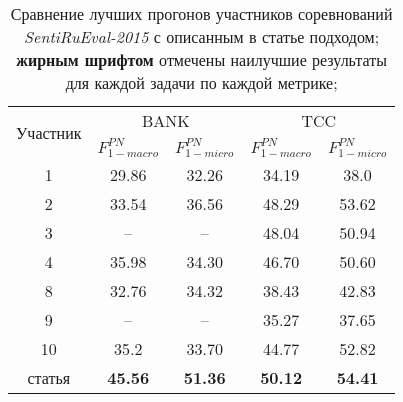 
\begin{table}[htp!]
\centering
\caption{
    Сравнение лучших прогонов участников соревнований {\it SentiRuEval-2015}
    с описанным в статье подходом;
    {\bf жирным шрифтом} отмечены наилучшие результаты для каждой задачи по
    каждой метрике;
}
\label{table:participants_results}
\begin{tabular}{ccccc}
\hline
\multicolumn{1}{l|}{\multirow{2}{*}{Участник}}                       & \multicolumn{2}{c|}{BANK}                                                         & \multicolumn{2}{c}{TCC}                                      \\ \cline{2-5}
\multicolumn{1}{l|}{}                                                & \multicolumn{1}{c|}{$F_{1-macro}^{PN}$} & \multicolumn{1}{c|}{$F_{1-micro}^{PN}$} & \multicolumn{1}{c|}{$F_{1-macro}^{PN}$} & $F_{1-micro}^{PN}$ \\ \hline
1 & 29.86 & 32.26 & 34.19 & 38.0  \\
2 & 33.54 & 36.56 & 48.29 & 53.62 \\
3 & --    & --    & 48.04 & 50.94 \\
4 & 35.98 & 34.30 & 46.70 & 50.60 \\
8 & 32.76 & 34.32 & 38.43 & 42.83 \\
9 & --    & --    & 35.27 & 37.65 \\
10&  35.2 & 33.70 & 44.77 & 52.82 \\ \hline
\cellcolor[HTML]{C0C0C0} статья & \cellcolor[HTML]{C0C0C0} \textbf{45.56} & \cellcolor[HTML]{C0C0C0} \textbf{51.36} & \cellcolor[HTML]{C0C0C0} \textbf{50.12} & \cellcolor[HTML]{C0C0C0}\textbf{54.41} \\ \hline
\end{tabular}
\end{table}
